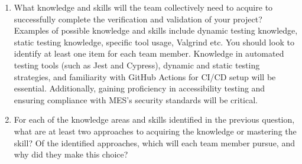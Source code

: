 \documentclass[12pt, titlepage]{article}
\begin{document}
\begin{enumerate}
  \item What knowledge and skills will the team collectively need to acquire to
  successfully complete the verification and validation of your project?
  Examples of possible knowledge and skills include dynamic testing knowledge,
  static testing knowledge, specific tool usage, Valgrind etc.  You should look to
  identify at least one item for each team member. 
  Knowledge in automated testing tools (such as Jest and Cypress), dynamic and static testing strategies, and familiarity with GitHub Actions for CI/CD setup will be essential. Additionally, gaining proficiency in accessibility testing and ensuring compliance with MES’s security standards will be critical.

  \item For each of the knowledge areas and skills identified in the previous
  question, what are at least two approaches to acquiring the knowledge or
  mastering the skill?  Of the identified approaches, which will each team
  member pursue, and why did they make this choice?
  
\end{enumerate}
\end{document}

